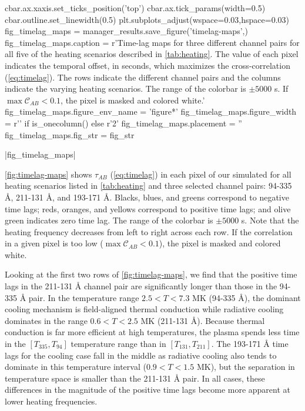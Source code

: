 \begin{pycode}
            cbar.ax.xaxis.set_ticks_position('top')
            cbar.ax.tick_params(width=0.5)
            cbar.outline.set_linewidth(0.5)
plt.subplots_adjust(wspace=0.03,hspace=0.03)
fig_timelag_maps = manager_results.save_figure('timelag-maps',)
fig_timelag_maps.caption = r'Time-lag maps for three different channel pairs for all five of the heating scenarios described in \autoref{tab:heating}. The value of each pixel indicates the temporal offset, in seconds, which maximizes the cross-correlation (\autoref{eq:timelag}). The rows indicate the different channel pairs and the columns indicate the varying heating scenarios. The range of the colorbar is $\pm5000$ s. If $\max{\mathcal{C}_{AB}}<0.1$, the pixel is masked and colored white.'
fig_timelag_maps.figure_env_name = 'figure*'
fig_timelag_maps.figure_width = r'\columnwidth' if is_onecolumn() else r'2\columnwidth'
fig_timelag_maps.placement = ''
fig_timelag_maps.fig_str = fig_str
\end{pycode}
|fig_timelag_maps|

\autoref{fig:timelag-maps} shows $\tau_{AB}$ (\autoref{eq:timelag}) in each pixel of our simulated \AR{} for all heating scenarios listed in \autoref{tab:heating} and three selected channel pairs: 94-335 \AA{}, 211-131 \AA{}, and 193-171 \AA{}. Blacks, blues, and greens correspond to negative time lags; reds, oranges, and yellows correspond to positive time lags; and olive green indicates zero time lag. The range of the colorbar is $\pm5000$ s. Note that the heating frequency decreases from left to right across each row. If the correlation in a given pixel is too low ($\max{\mathcal{C}_{AB}}<0.1$), the pixel is masked and colored white.

Looking at the first two rows of \autoref{fig:timelag-maps}, we find that the positive time lags in the 211-131 \AA{} channel pair are significantly longer than those in the 94-335 \AA{} pair. In the temperature range $2.5<T<7.3$ MK (94-335 \AA{}), the dominant cooling mechanism is field-aligned thermal conduction while radiative cooling dominates in the range $0.6<T<2.5$ MK (211-131 \AA{}). Because thermal conduction is far more efficient at high temperatures, the plasma spends less time in the $[T_{335},T_{94}]$ temperature range than in $[T_{131},T_{211}]$. The 193-171 \AA{} time lags for the cooling case fall in the middle as radiative cooling also tends to dominate in this temperature interval ($0.9<T<1.5$ MK), but the separation in temperature space is smaller than the 211-131 \AA{} pair. In all cases, these differences in the magnitude of the positive time lags become more apparent at lower heating frequencies.

